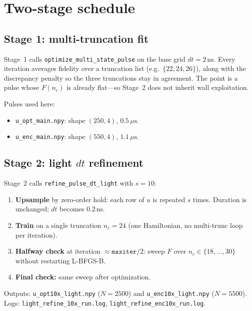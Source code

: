 \documentclass[11pt]{article}
\begin{document}
\section{Two-stage schedule}
\label{sec:schedule}

\subsection{Stage 1: multi-truncation fit}

Stage~1 calls \texttt{optimize\_multi\_state\_pulse} on the base grid
$dt=2\,\mathrm{ns}$. Every iteration averages fidelity over a truncation
list (e.g.\ $\{22,24,26\}$), along with the discrepancy penalty so the
three truncations stay in agreement. The point is a pulse whose $F(n_c)$ is
already flat---so Stage~2 does not inherit wall exploitation.

Pulses used here:
\begin{itemize}
  \item \texttt{u\_opt\_main.npy}: shape $(250,4)$, $0.5\,\mu\mathrm{s}$.
  \item \texttt{u\_enc\_main.npy}: shape $(550,4)$, $1.1\,\mu\mathrm{s}$.
\end{itemize}

\subsection{Stage 2: light $dt$ refinement}

Stage~2 calls \texttt{refine\_pulse\_dt\_light} with $s=10$:
\begin{enumerate}
  \item \textbf{Upsample} by zero-order hold: each row of $u$ is repeated
        $s$ times. Duration is unchanged; $dt$ becomes $0.2\,\mathrm{ns}$.
  \item \textbf{Train} on a single truncation $n_c=24$ (one Hamiltonian,
        no multi-trunc loop per iteration).
  \item \textbf{Halfway check} at iteration $\approx\texttt{maxiter}/2$:
        sweep $F$ over $n_c\in\{18,\ldots,30\}$ without restarting L-BFGS-B.
  \item \textbf{Final check:} same sweep after optimization.
\end{enumerate}
Outputs: \texttt{u\_opt10x\_light.npy} ($N=2500$) and
\texttt{u\_enc10x\_light.npy} ($N=5500$). Logs:
\texttt{light\_refine\_10x\_run.log},
\texttt{light\_refine\_enc10x\_run.log}.
\end{document}
